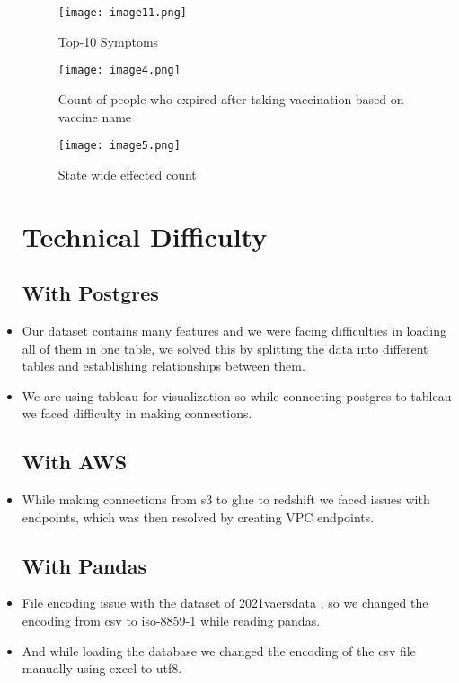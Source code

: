 \documentclass[conference]{IEEEtran}
\begin{document}
\begin{itemize}
\begin{figure}[htp]
    \centering
    \texttt{[image: image11.png]}
    \caption{Top-10 Symptoms}
    \label{fig:galaxy}
\end{figure}



\begin{figure}[htp]
    \centering
    \texttt{[image: image4.png]}
    \caption{Count of people who expired after taking vaccination based on vaccine name}
    \label{fig:galaxy}
\end{figure}


\begin{figure}[htp]
    \centering
    \texttt{[image: image5.png]}
    \caption{State wide effected count}
    \label{fig:galaxy}
\end{figure}




\section{Technical Difficulty}
\subsection{With Postgres}
\item Our dataset contains many features and we were facing difficulties in loading all of them in one table, we solved this by splitting the data into different tables and establishing relationships between them.
\item We are using tableau for visualization so while connecting postgres to tableau we faced difficulty in making connections.

\subsection{With AWS}
\item While making connections from s3 to glue to redshift we faced issues with endpoints, which was then resolved by creating VPC endpoints.
 \subsection{With Pandas}
 \item File encoding issue with the dataset of 2021vaersdata , so we changed the encoding from csv to iso-8859-1 while reading pandas.
\item And while loading the database we changed the encoding of the csv file manually using excel to utf8.




\end{itemize}
\end{document}
